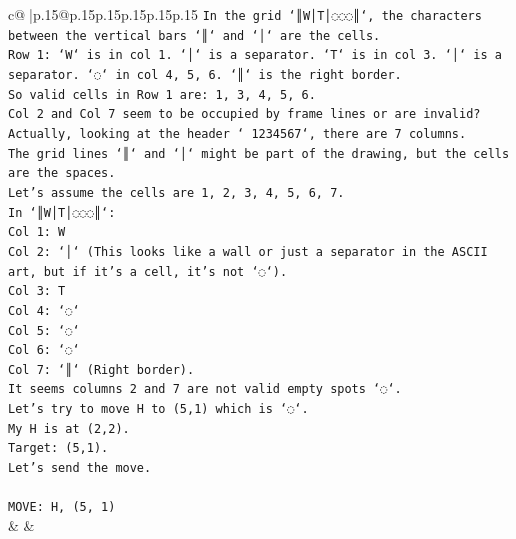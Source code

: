 \documentclass{article}
\begin{document}
{\begin{supertabular}{c@{$\;$}|p{.15\linewidth}@{}p{.15\linewidth}p{.15\linewidth}p{.15\linewidth}p{.15\linewidth}p{.15\linewidth}}
{{{\texttt{In the grid `║W│T│◌◌◌║`, the characters between the vertical bars `║` and `│` are the cells.} \\
\texttt{Row 1: `W` is in col 1. `│` is a separator. `T` is in col 3. `│` is a separator. `◌` in col 4, 5, 6. `║` is the right border.} \\
\texttt{So valid cells in Row 1 are: 1, 3, 4, 5, 6.} \\
\texttt{Col 2 and Col 7 seem to be occupied by frame lines or are invalid?} \\
\texttt{Actually, looking at the header ` 1234567`, there are 7 columns.} \\
\texttt{The grid lines `║` and `│` might be part of the drawing, but the cells are the spaces.} \\
\texttt{Let's assume the cells are 1, 2, 3, 4, 5, 6, 7.} \\
\texttt{In `║W│T│◌◌◌║`:} \\
\texttt{Col 1: W} \\
\texttt{Col 2: `│` (This looks like a wall or just a separator in the ASCII art, but if it's a cell, it's not `◌`).} \\
\texttt{Col 3: T} \\
\texttt{Col 4: `◌`} \\
\texttt{Col 5: `◌`} \\
\texttt{Col 6: `◌`} \\
\texttt{Col 7: `║` (Right border).} \\
\texttt{It seems columns 2 and 7 are not valid empty spots `◌`.} \\
\texttt{Let's try to move H to (5,1) which is `◌`.} \\
\texttt{My H is at (2,2).} \\
\texttt{Target: (5,1).} \\
\texttt{Let's send the move.} \\
\\ 
\texttt{MOVE: H, (5, 1)} \\
            }
        }
    }
    & & \\ \\


\end{supertabular}}
\end{document}
